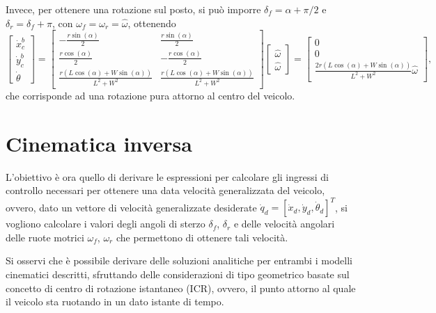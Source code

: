 Invece, per ottenere una rotazione sul posto, si può imporre $\delta_f = \alpha+\pi/2$ e $\delta_r = \delta_f + \pi$, con $\omega_f = \omega_r = \hat{\omega}$, ottenendo
\begin{equation}
    \begin{bmatrix}
        \dot{x}_c^b \\
        \dot{y}_c^b \\
        \dot{\theta}
    \end{bmatrix} =
    \begin{bmatrix}- \frac{r \sin{\left(\alpha \right)}}{2} & \frac{r \sin{\left(\alpha \right)}}{2}\\\frac{r \cos{\left(\alpha \right)}}{2} & - \frac{r \cos{\left(\alpha \right)}}{2}\\\frac{r \left(L \cos{\left(\alpha \right)} + W \sin{\left(\alpha \right)}\right)}{L^{2} + W^{2}} & \frac{r \left(L \cos{\left(\alpha \right)} + W \sin{\left(\alpha \right)}\right)}{L^{2} + W^{2}}\end{bmatrix}
    \begin{bmatrix}\hat{\omega}\\\hat{\omega}\end{bmatrix} =
    \begin{bmatrix}0 \\0\\\frac{2 r \left(L \cos{\left(\alpha \right)} + W \sin{\left(\alpha \right)}\right)}{L^{2} + W^{2}} \hat{\omega}
    \end{bmatrix},
\end{equation}
che corrisponde ad una rotazione pura attorno al centro del veicolo.

\section{Cinematica inversa}
L'obiettivo è ora quello di derivare le espressioni per calcolare gli ingressi di controllo necessari per ottenere una data velocità generalizzata del veicolo, ovvero, dato un vettore di velocità generalizzate desiderate $\dot{q}_d = [\dot{x}_d, \dot{y}_d, \dot{\theta}_d]^T$, si vogliono calcolare i valori degli angoli di sterzo $\delta_f$, $\delta_r$ e delle velocità angolari delle ruote motrici $\omega_f$, $\omega_r$ che permettono di ottenere tali velocità.

Si osservi che è possibile derivare delle soluzioni analitiche per entrambi i modelli cinematici descritti, sfruttando delle considerazioni di tipo geometrico basate sul concetto di centro di rotazione istantaneo (ICR), ovvero, il punto attorno al quale il veicolo sta ruotando in un dato istante di tempo.

